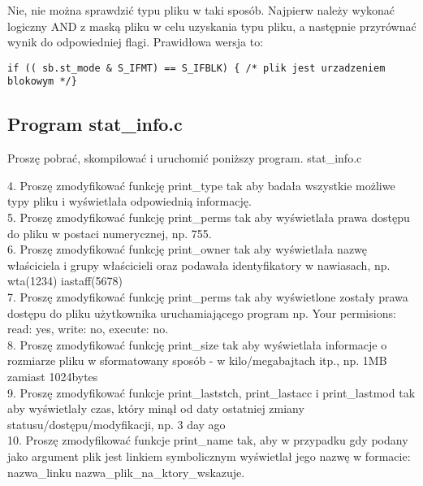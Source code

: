 \documentclass[a4paper,15pt]{article}
\newcommand{\assignment}[2]{
    \begin{tcolorbox}[colback=black!5!white,colframe=black,title={Zadanie #1}]
        #2
    \end{tcolorbox}
}
\begin{document}
Nie, nie można sprawdzić typu pliku w taki sposób. Najpierw należy wykonać logiczny AND z maską pliku w celu uzyskania typu pliku, a następnie przyrównać wynik do odpowiedniej flagi. Prawidłowa wersja to:
\begin{lstlisting}[style=CStyle, label=some-code]
if (( sb.st_mode & S_IFMT) == S_IFBLK) { /* plik jest urzadzeniem blokowym */}
\end{lstlisting}

\subsection{Program stat\_info.c}
\assignment{}{
Proszę pobrać, skompilować i uruchomić poniższy program. stat\_info.c
}

\newpage
\assignment{}{
4. Proszę zmodyfikować funkcję print\_type tak aby badała wszystkie możliwe typy pliku i wyświetlała odpowiednią informację. \\
5. Proszę zmodyfikować funkcję print\_perms tak aby wyświetlała prawa dostępu do pliku w postaci numerycznej, np. 755. \\
6. Proszę zmodyfikować funkcję print\_owner tak aby wyświetlała nazwę właściciela i grupy właścicieli oraz podawała identyfikatory w nawiasach, np. wta(1234) iastaff(5678) \\
7. Proszę zmodyfikować funkcję print\_perms tak aby wyświetlone zostały prawa dostępu do pliku użytkownika uruchamiającego program np. Your permisions: read: yes, write: no, execute: no. \\
8. Proszę zmodyfikować funkcję print\_size tak aby wyświetlała informacje o rozmiarze pliku w sformatowany sposób - w kilo/megabajtach itp., np. 1MB zamiast 1024bytes \\
9. Proszę zmodyfikować funkcje print\_laststch, print\_lastacc i print\_lastmod tak aby wyświetlały czas, który minął od daty ostatniej zmiany statusu/dostępu/modyfikacji, np. 3 day ago \\
10. Proszę zmodyfikować funkcje print\_name tak, aby w przypadku gdy podany jako argument plik jest linkiem symbolicznym wyświetlał jego nazwę w formacie: nazwa\_linku  nazwa\_plik\_na\_ktory\_wskazuje. 
}
\end{document}
